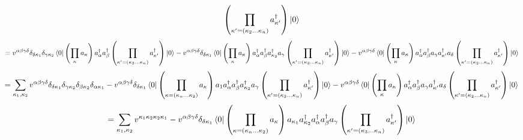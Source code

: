 \documentclass[12pt]{article}
\begin{document}
\begin{enumerate}
\begin{dmath}
        \left(\prod_{\kappa^{\prime}=\left(\kappa_{2}\dots\kappa_{n}\right)}^{}
        a^{\dag}_{\kappa^{\prime}}\right)\ket{0}
    \end{dmath}
    \begin{dmath}
    =v^{\alpha\beta\gamma\delta}
    \delta_{\delta\kappa_{1}}\delta_{\gamma\kappa_{2}}
    \bra{0}\left(\prod_{\kappa}^{}a_{\kappa}\right)
    a^{\dag}_{\alpha}a^{\dag}_{\beta}
    \left(\prod_{\kappa^{\prime}=\left(\kappa_{3}\dots\kappa_{n}\right)}^{}a^{\dag}_{\kappa^{\prime}}\right)\ket{0}
    -v^{\alpha\beta\gamma\delta}
    \delta_{\delta\kappa_{1}}
    \bra{0}\left(\prod_{\kappa}^{}a_{\kappa}\right)
    a^{\dag}_{\alpha}a^{\dag}_{\beta}a^{\dag}_{\kappa_{2}}a_{\gamma}
    \left(\prod_{\kappa^{\prime}=\left(\kappa_{3}\dots\kappa_{n}\right)}^{}a^{\dag}_{\kappa^{\prime}}\right)\ket{0}
    -v^{\alpha\beta\gamma\delta}
    \bra{0}\left(\prod_{\kappa}^{}a_{\kappa}\right)
    a^{\dag}_{\alpha}a^{\dag}_{\beta}a_{\gamma}a^{\dag}_{\kappa^{\prime}}a_{\delta}
    \left(\prod_{\kappa^{\prime}=\left(\kappa_{2}\dots\kappa_{n}\right)}^{}a^{\dag}_{\kappa^{\prime}}\right)\ket{0}
    \end{dmath}
    \begin{dmath}
    =\sum_{\kappa_{1},\kappa_{2}}^{} 
    v^{\alpha\beta\gamma\delta}\delta_{\delta\kappa_{1}}\delta_{\gamma\kappa_{2}}\delta_{\beta\kappa_{2}}\delta_{\alpha\kappa_{1}}
    -v^{\alpha\beta\gamma\delta}
    \delta_{\delta\kappa_{1}}
    \bra{0}\left(\prod_{\kappa=\left(\kappa_{n}\dots\kappa_{2}\right)}^{}a_{\kappa}\right)
    a_{1}a^{\dag}_{\alpha}a^{\dag}_{\beta}a^{\dag}_{\kappa_{2}}a_{\gamma}
    \left(\prod_{\kappa^{\prime}=\left(\kappa_{3}\dots\kappa_{n}\right)}^{}a^{\dag}_{\kappa^{\prime}}\right)\ket{0}
    -v^{\alpha\beta\gamma\delta}
    \bra{0}\left(\prod_{\kappa}^{}a_{\kappa}\right)
    a^{\dag}_{\alpha}a^{\dag}_{\beta}a_{\gamma}a^{\dag}_{\kappa^{\prime}}a_{\delta}
    \left(\prod_{\kappa^{\prime}=\left(\kappa_{2}\dots\kappa_{n}\right)}^{}a^{\dag}_{\kappa^{\prime}}\right)\ket{0}
    \end{dmath}
    \begin{dmath}
    =\sum_{\kappa_{1},\kappa_{2}}^{} 
    v^{\kappa_{1}\kappa_{2}\kappa_{2}\kappa_{1}}
        -v^{\alpha\beta\gamma\delta}
        \delta_{\delta\kappa_{1}}
        \bra{0}\left(\prod_{\kappa=\left(\kappa_{n}\dots\kappa_{2 }\right)}^{}a_{\kappa}\right)
        a_{\kappa_{1}}a^{\dag}_{\kappa_{2}}a^{\dag}_{\alpha}a^{\dag}_{\beta}a_{\gamma}
        \left(\prod_{\kappa^{\prime}=\left(\kappa_{3}\dots\kappa_{n}\right)}^{}a^{\dag}_{\kappa^{\prime}}\right)\ket{0}

\end{dmath}
\end{enumerate}
\end{document}
